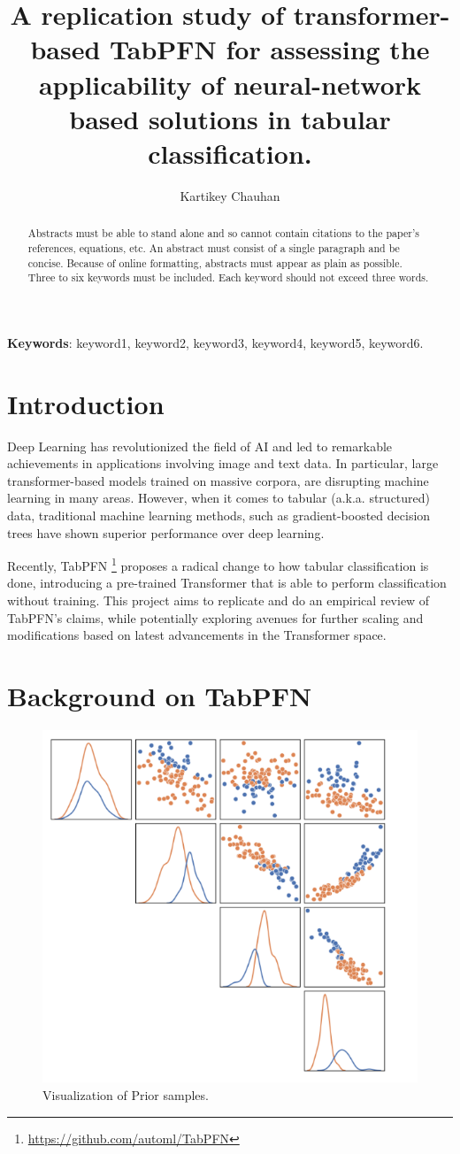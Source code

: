 \documentclass[a4paper]{article}
\title{A replication study of transformer-based TabPFN for assessing the applicability of neural-network based solutions in tabular classification.}
\author[1]{Kartikey Chauhan}
\affil[1]{\small Data Science \& Analytics, Toronto Metropolitan University}
\date{}  %
\begin{document}
\maketitle

\begin{abstract}
Abstracts must be able to stand alone and so cannot contain citations to the paper’s references, equations, etc. An abstract must consist of a single paragraph and be concise. Because of online formatting, abstracts must appear as plain as possible. Three to six keywords must be included. Each keyword should not exceed three words. %
\end{abstract}

\textbf{Keywords}: keyword1, keyword2, keyword3, keyword4, keyword5, keyword6.  

\section{Introduction}

Deep Learning has revolutionized the field of AI and led to remarkable achievements in applications involving image and text data. In particular, large transformer-based models trained on massive corpora, are disrupting machine learning in many areas. However, when it comes to tabular (a.k.a. structured) data, traditional machine learning methods, such as gradient-boosted decision trees have shown superior performance over deep learning. 

Recently, TabPFN \cite{hollmann2023tabpfn} \footnote{\url{https://github.com/automl/TabPFN}} proposes a radical change to how tabular classification is done, introducing a pre-trained Transformer that is able to perform classification without training. This project aims to replicate and do an empirical review of TabPFN's claims, while potentially exploring avenues for further scaling and modifications based on latest advancements in the Transformer space.

\section{Background on TabPFN}\label{sec2}


\begin{figure}[!ht]
  \centering
  \includegraphics[width=0.4\linewidth]{figures/priors_visualized.png}
  \caption{\label{fig:priors} Visualization of Prior samples.}
  \end{figure}
\end{document}
